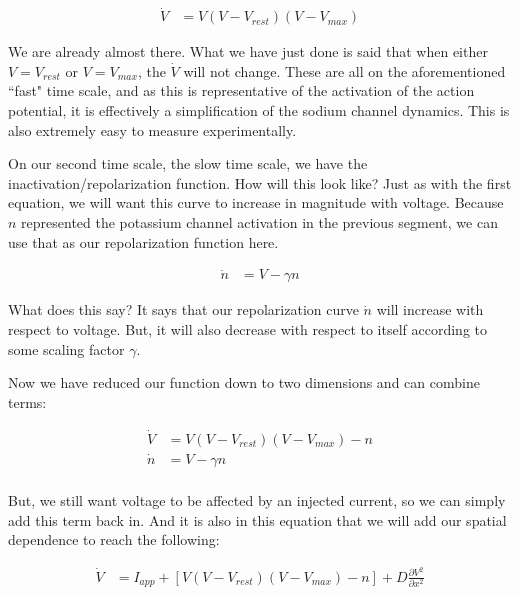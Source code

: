 \documentclass[12pt]{report}
\begin{document}
\begin{equation} \label{fn2}
\begin{split}
\dot{V} &= V(V - V_{rest})(V - V_{max})
\end{split}
\end{equation}

We are already almost there. What we have just done is said that when either $V = V_{rest}$ or $V = V_{max}$, the $\dot{V}$ will not change. These are all on the aforementioned ``fast" time scale, and as this is representative of the activation of the action potential, it is effectively a simplification of the sodium channel dynamics. This is also extremely easy to measure experimentally.\newline

On our second time scale, the slow time scale, we have the inactivation/repolarization function. How will this look like? Just as with the first equation, we will want this curve to increase in magnitude with voltage. Because $n$ represented the potassium channel activation in the previous segment, we can use that as our repolarization function here. 

\begin{equation} \label{fn3}
\begin{split}
\dot{n} &= V - \gamma n
\end{split}
\end{equation}

What does this say? It says that our repolarization curve $\dot{n}$ will increase with respect to voltage. But, it will also decrease with respect to itself according to some scaling factor $\gamma$.\newline

Now we have reduced our function down to two dimensions and can combine terms: 
    
\begin{equation} \label{fn4}
\begin{split}
    \dot{V} &= V(V - V_{rest})(V - V_{max}) - n\\ 
    \dot{n} &= V - \gamma n\\
\end{split}
\end{equation}

But, we still want voltage to be affected by an injected current, so we can simply add this term back in. And it is also in this equation that we will add our spatial dependence to reach the following: 

\begin{equation} \label{fn5}
\begin{split}
    \dot{V} &= I_{app} + [V(V - V_{rest})(V - V_{max}) - n] +  D\frac{\partial V^2}{\partial x^2}\\
\end{split}
\end{equation}
\end{document}
